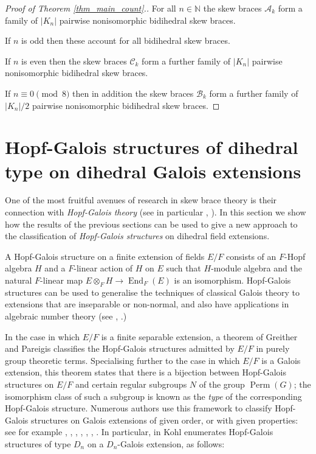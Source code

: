 \documentclass[reqno]{amsart}
\theoremstyle{definition}
\newcommand{\N}{\mathbb{N}}
\DeclareMathOperator{\Perm}{\mbox{Perm}}
\DeclareMathOperator{\End}{\mbox{End}}
\begin{document}
\begin{proof}[Proof of Theorem \ref{thm_main_count}.]
For all $ n \in \N $ the skew braces $ \mathscr{A}_{k} $ form a family of $ |K_{n}| $ pairwise nonisomorphic bidihedral skew braces. 

If $ n $ is odd then these account for all bidihedral skew braces. 

If $ n $ is even then the skew braces $ \mathscr{C}_{k} $ form a further family of $ |K_{n}| $ pairwise nonisomorphic bidihedral skew braces. 

If $ n \equiv 0 \pmod{8} $ then in addition the skew braces $ \mathscr{B}_{k} $ form a further family of $ |K_{n}|/2 $ pairwise nonisomorphic bidihedral skew braces. 

\end{proof}




\section{Hopf-Galois structures of dihedral type on dihedral Galois extensions} \label{sec_HGS}

One of the most fruitful avenues of research in skew brace theory is their connection with \textit{Hopf-Galois theory} (see in particular \cite{HAGMT}, \cite{ST23a}). In this section we show how the results of the previous sections can be used to give a new approach to the classification of \textit{Hopf-Galois structures} on dihedral field extensions.  

A Hopf-Galois structure on a finite extension of fields $ E/F $ consists of an $ F $-Hopf algebra $ H $ and a $ F $-linear action of $ H $ on $ E $ such that $ H $-module algebra and the natural $ F $-linear map $ E \otimes_{F} H \rightarrow \End_{F}(E) $ is an isomorphism. Hopf-Galois structures can be used to generalise the techniques of classical Galois theory to extensions that are inseparable or non-normal, and also have applications in algebraic number theory (see \cite{TWE}, \cite{HAGMT}.)

In the case in which $ E/F $ is a finite separable extension, a theorem of Greither and Pareigis \cite{GP87} classifies the Hopf-Galois structures admitted by $ E/F $ in purely group theoretic terms. Specialising further to the case in which $ E/F $ is a Galois extension, this theorem states that there is a bijection between Hopf-Galois structures on $ E/F $ and certain regular subgroups $ N $ of the group $ \Perm(G) $; the isomorphism class of such a subgroup is known as the \textit{type} of the corresponding Hopf-Galois structure. Numerous authors use this framework to classify Hopf-Galois structures on Galois extensions of given order, or with given properties: see for example \cite{Ch96}, \cite{By96}, \cite{Ko98}, \cite{CC99}, \cite{By04c}, \cite{By07}, \cite{Ko13}. In particular, in \cite{Ko20} Kohl enumerates Hopf-Galois structures of type $ D_{n} $ on a $ D_{n} $-Galois extension, as follows: 
\end{document}
